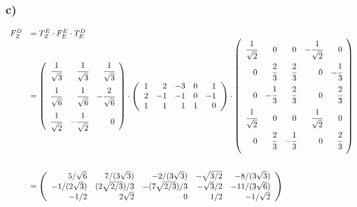 \documentclass[main.tex]{subfiles}
\begin{document}
\subsubsection{c)}
\renewcommand{\dfrac}[2]{\cfrac{#1}{#2}}
\begin{align*}
    \begin{array}{rl}
        F^D_Z & = T^E_Z\cdot F^E_E\cdot T^D_E\\
        & = \eqmatrix{rrr}{
            \dfrac{1}{\sqrt{3}} & \dfrac{1}{\sqrt{3}} & \dfrac{1}{\sqrt{3}}\\[4mm]
            \dfrac{1}{\sqrt{6}} & \dfrac{1}{\sqrt{6}} & -\dfrac{2}{\sqrt{6}}\\[4mm]
            \dfrac{1}{\sqrt{2}} & -\dfrac{1}{\sqrt{2}} & 0
        } \cdot
        \eqmatrix{rrrrr}{
            1 & 2 & -3 & 0 & 1\\
            2 & -1 & -1 & 0 & -1\\
            1 & 1 & 1 & 1 & 0
        } \cdot
        \eqmatrix{rrrrr}{
            \dfrac{1}{\sqrt{2}} & 0 & 0 & -\dfrac{1}{\sqrt{2}} & 0\\[3mm]
            0 & \dfrac{2}{3} & \dfrac{2}{3} & 0 & -\dfrac{1}{3}   \\[3mm]
            0 & -\dfrac{1}{3} & \dfrac{2}{3} & 0 & \dfrac{2}{3}   \\[3mm]
            \dfrac{1}{\sqrt{2}} & 0 & 0 & \dfrac{1}{\sqrt{2}} & 0 \\[3mm]
            0 & \dfrac{2}{3} & -\dfrac{1}{3} & 0 & \dfrac{2}{3}   \\[3mm]
        }\\[30mm]
        &= \eqmatrix{rrrrr}{
     5/\sqrt{6} & 7/(3 \sqrt{3})   &   -2/(3 \sqrt{3}) & -\sqrt{3/2} & -8/(3 \sqrt{3}) \\
-1/(2 \sqrt{3}) & (2 \sqrt{2/3})/3 & -(7 \sqrt{2/3})/3 & -\sqrt{3}/2 & -11/(3 \sqrt{6}) \\
           -1/2 & 2 \sqrt{2}       &                 0 &         1/2 & -1/\sqrt{2}
        }
    \end{array}
\end{align*}
\end{document}
